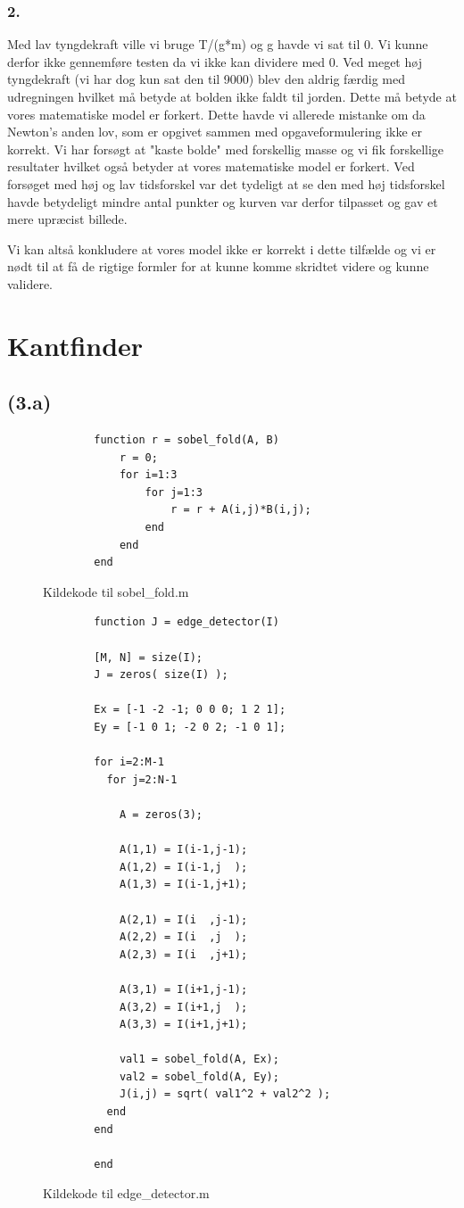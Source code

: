 \documentclass{article}
\begin{document}
\subsubsection*{2.}
Med lav tyngdekraft ville vi bruge T/(g*m) og g havde vi sat til 0. Vi kunne derfor ikke gennemføre testen da vi ikke kan dividere med 0.
Ved meget høj tyngdekraft (vi har dog kun sat den til 9000) blev den aldrig færdig med udregningen hvilket må betyde at bolden ikke faldt til jorden. Dette må betyde at vores matematiske model er forkert. Dette havde vi allerede mistanke om da Newton's anden lov, som er opgivet sammen med opgaveformulering ikke er korrekt.
Vi har forsøgt at "kaste bolde" med forskellig masse og vi fik forskellige resultater hvilket også betyder at vores matematiske model er forkert.
Ved forsøget med høj og lav tidsforskel var det tydeligt at se den med høj tidsforskel havde betydeligt mindre antal punkter og kurven var derfor tilpasset og gav et mere upræcist billede.

Vi kan altså konkludere at vores model ikke er korrekt i dette tilfælde og vi er nødt til at få de rigtige formler for at kunne komme skridtet videre og kunne validere.

\section{Kantfinder}

\subsection*{(3.a)}

\begin{figure}
	\begin{verbatim}
		function r = sobel_fold(A, B)
		    r = 0;
		    for i=1:3
		        for j=1:3
		            r = r + A(i,j)*B(i,j);
		        end
		    end
		end
	\end{verbatim}
	\caption{Kildekode til sobel\_fold.m}
	\label{sobelfold}
\end{figure}

\begin{figure}
	\begin{verbatim}
		function J = edge_detector(I)

		[M, N] = size(I);
		J = zeros( size(I) );

		Ex = [-1 -2 -1; 0 0 0; 1 2 1];
		Ey = [-1 0 1; -2 0 2; -1 0 1];

		for i=2:M-1
		  for j=2:N-1

		    A = zeros(3);

		    A(1,1) = I(i-1,j-1);
		    A(1,2) = I(i-1,j  );
		    A(1,3) = I(i-1,j+1);

		    A(2,1) = I(i  ,j-1);
		    A(2,2) = I(i  ,j  );
		    A(2,3) = I(i  ,j+1);

		    A(3,1) = I(i+1,j-1);
		    A(3,2) = I(i+1,j  );
		    A(3,3) = I(i+1,j+1);

		    val1 = sobel_fold(A, Ex);
		    val2 = sobel_fold(A, Ey);
		    J(i,j) = sqrt( val1^2 + val2^2 );
		  end
		end

		end
	\end{verbatim}
	\caption{Kildekode til edge\_detector.m}
	\label{edgedetector}
\end{figure}
\end{document}

